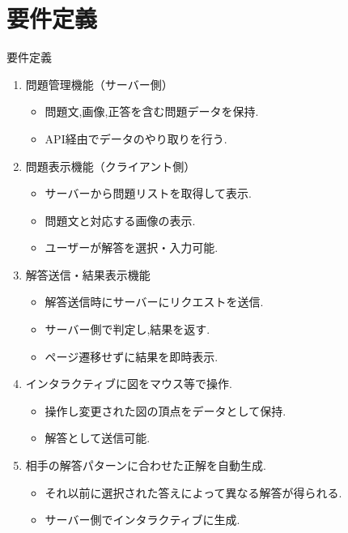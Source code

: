 \documentclass[aspectratio=169]{beamer}
\begin{document}
\section{要件定義}

\begin{frame}[allowframebreaks]{要件定義}
    \begin{enumerate}
        \setlength{\parskip}{1em}
        \item 問題管理機能（サーバー側）
        \begin{itemize}
            \item 問題文,画像,正答を含む問題データを保持.
            \item API経由でデータのやり取りを行う.
        \end{itemize}
        \item 問題表示機能（クライアント側）
        \begin{itemize}
            \item サーバーから問題リストを取得して表示.
            \item 問題文と対応する画像の表示.
            \item ユーザーが解答を選択・入力可能.
        \end{itemize}
        \newpage
        \item 解答送信・結果表示機能
        \begin{itemize}
            \item 解答送信時にサーバーにリクエストを送信.
            \item サーバー側で判定し,結果を返す.
            \item ページ遷移せずに結果を即時表示.
        \end{itemize}
        \item インタラクティブに図をマウス等で操作.
        \begin{itemize}
            \item 操作し変更された図の頂点をデータとして保持.
            \item 解答として送信可能.
        \end{itemize}
        \item 相手の解答パターンに合わせた正解を自動生成.
        \begin{itemize}
            \item それ以前に選択された答えによって異なる解答が得られる.
            \item サーバー側でインタラクティブに生成.
        \end{itemize}
    \end{enumerate}
\end{frame}
\end{document}
